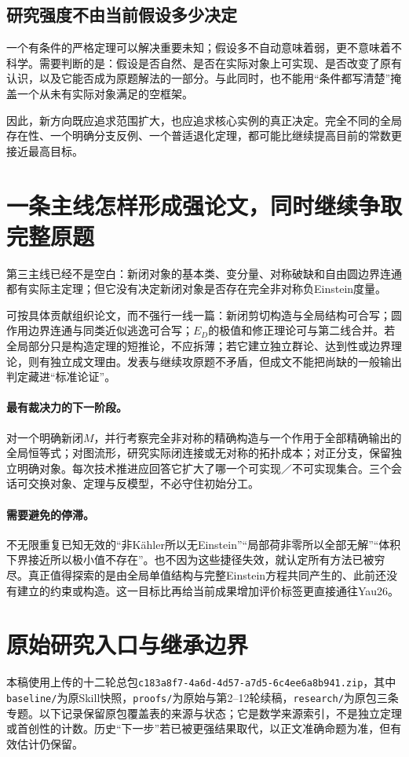 \documentclass[UTF8,fontset=fandol,zihao=-4]{ctexart}
\theoremstyle{cn}
\begin{document}
\subsection{研究强度不由当前假设多少决定}
一个有条件的严格定理可以解决重要未知；假设多不自动意味着弱，更不意味着不科学。需要判断的是：假设是否自然、是否在实际对象上可实现、是否改变了原有认识，以及它能否成为原题解法的一部分。与此同时，也不能用“条件都写清楚”掩盖一个从未有实际对象满足的空框架。

因此，新方向既应追求范围扩大，也应追求核心实例的真正决定。完全不同的全局存在性、一个明确分支反例、一个普适退化定理，都可能比继续提高目前的常数更接近最高目标。

\section{一条主线怎样形成强论文，同时继续争取完整原题}
第三主线已经不是空白：新闭对象的基本类、变分量、对称破缺和自由圆边界连通都有实际主定理；但它没有决定新闭对象是否存在完全非对称负Einstein度量。

可按具体贡献组织论文，而不强行一线一篇：新闭剪切构造与全局结构可合写；圆作用边界连通与同类近似逃逸可合写；$E_D$的极值和修正理论可与第二线合并。若全局部分只是构造定理的短推论，不应拆薄；若它建立独立群论、达到性或边界理论，则有独立成文理由。发表与继续攻原题不矛盾，但成文不能把尚缺的一般输出判定藏进“标准论证”。

\paragraph{最有裁决力的下一阶段。}
对一个明确新闭$M$，并行考察完全非对称的精确构造与一个作用于全部精确输出的全局恒等式；对图流形，研究实际闭连接或无对称的拓扑成本；对正分支，保留独立明确对象。每次技术推进应回答它扩大了哪一个可实现／不可实现集合。三个会话可交换对象、定理与反模型，不必守住初始分工。

\paragraph{需要避免的停滞。}
不无限重复已知无效的“非Kähler所以无Einstein”“局部荷非零所以全部无解”“体积下界接近所以极小值不存在”。也不因为这些捷径失效，就认定所有方法已被穷尽。真正值得探索的是由全局单值结构与完整Einstein方程共同产生的、此前还没有建立的约束或构造。这一目标比再给当前成果增加评价标签更直接通往Yau26。
\appendix
\section{原始研究入口与继承边界}
本稿使用上传的十二轮总包\nolinkurl{c183a8f7-4a6d-4d57-a7d5-6c4ee6a8b941.zip}，其中\nolinkurl{baseline/}为原Skill快照，\nolinkurl{proofs/}为原始与第2--12轮续稿，\nolinkurl{research/}为原包三条专题。以下记录保留原包覆盖表的来源与状态；它是数学来源索引，不是独立定理或首创性的计数。历史“下一步”若已被更强结果取代，以正文准确命题为准，但有效估计仍保留。
\end{document}

